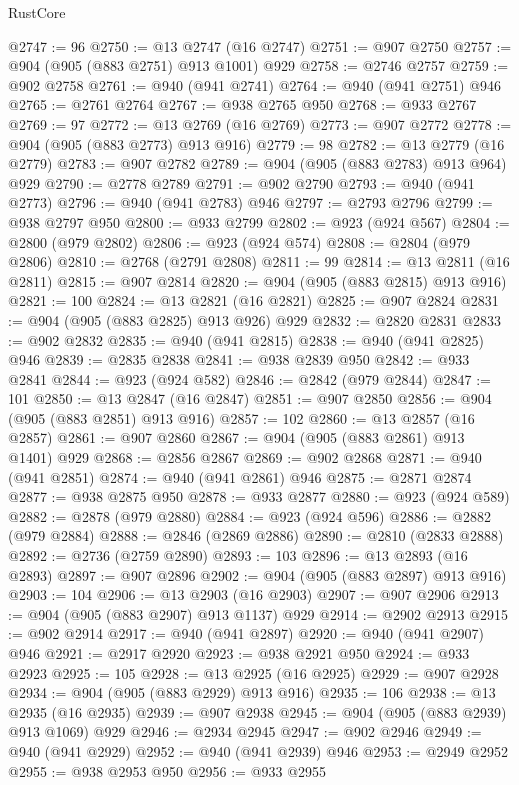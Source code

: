 \begin{lexlean}{RustCore}
\begin{coremodule}
@2747 := 96
@2750 := @13 @2747 (@16 @2747)
@2751 := @907 @2750
@2757 := @904 (@905 (@883 @2751) @913 @1001) @929
@2758 := @2746 @2757
@2759 := @902 @2758
@2761 := @940 (@941 @2741)
@2764 := @940 (@941 @2751) @946
@2765 := @2761 @2764
@2767 := @938 @2765 @950
@2768 := @933 @2767
@2769 := 97
@2772 := @13 @2769 (@16 @2769)
@2773 := @907 @2772
@2778 := @904 (@905 (@883 @2773) @913 @916)
@2779 := 98
@2782 := @13 @2779 (@16 @2779)
@2783 := @907 @2782
@2789 := @904 (@905 (@883 @2783) @913 @964) @929
@2790 := @2778 @2789
@2791 := @902 @2790
@2793 := @940 (@941 @2773)
@2796 := @940 (@941 @2783) @946
@2797 := @2793 @2796
@2799 := @938 @2797 @950
@2800 := @933 @2799
@2802 := @923 (@924 @567)
@2804 := @2800 (@979 @2802)
@2806 := @923 (@924 @574)
@2808 := @2804 (@979 @2806)
@2810 := @2768 (@2791 @2808)
@2811 := 99
@2814 := @13 @2811 (@16 @2811)
@2815 := @907 @2814
@2820 := @904 (@905 (@883 @2815) @913 @916)
@2821 := 100
@2824 := @13 @2821 (@16 @2821)
@2825 := @907 @2824
@2831 := @904 (@905 (@883 @2825) @913 @926) @929
@2832 := @2820 @2831
@2833 := @902 @2832
@2835 := @940 (@941 @2815)
@2838 := @940 (@941 @2825) @946
@2839 := @2835 @2838
@2841 := @938 @2839 @950
@2842 := @933 @2841
@2844 := @923 (@924 @582)
@2846 := @2842 (@979 @2844)
@2847 := 101
@2850 := @13 @2847 (@16 @2847)
@2851 := @907 @2850
@2856 := @904 (@905 (@883 @2851) @913 @916)
@2857 := 102
@2860 := @13 @2857 (@16 @2857)
@2861 := @907 @2860
@2867 := @904 (@905 (@883 @2861) @913 @1401) @929
@2868 := @2856 @2867
@2869 := @902 @2868
@2871 := @940 (@941 @2851)
@2874 := @940 (@941 @2861) @946
@2875 := @2871 @2874
@2877 := @938 @2875 @950
@2878 := @933 @2877
@2880 := @923 (@924 @589)
@2882 := @2878 (@979 @2880)
@2884 := @923 (@924 @596)
@2886 := @2882 (@979 @2884)
@2888 := @2846 (@2869 @2886)
@2890 := @2810 (@2833 @2888)
@2892 := @2736 (@2759 @2890)
@2893 := 103
@2896 := @13 @2893 (@16 @2893)
@2897 := @907 @2896
@2902 := @904 (@905 (@883 @2897) @913 @916)
@2903 := 104
@2906 := @13 @2903 (@16 @2903)
@2907 := @907 @2906
@2913 := @904 (@905 (@883 @2907) @913 @1137) @929
@2914 := @2902 @2913
@2915 := @902 @2914
@2917 := @940 (@941 @2897)
@2920 := @940 (@941 @2907) @946
@2921 := @2917 @2920
@2923 := @938 @2921 @950
@2924 := @933 @2923
@2925 := 105
@2928 := @13 @2925 (@16 @2925)
@2929 := @907 @2928
@2934 := @904 (@905 (@883 @2929) @913 @916)
@2935 := 106
@2938 := @13 @2935 (@16 @2935)
@2939 := @907 @2938
@2945 := @904 (@905 (@883 @2939) @913 @1069) @929
@2946 := @2934 @2945
@2947 := @902 @2946
@2949 := @940 (@941 @2929)
@2952 := @940 (@941 @2939) @946
@2953 := @2949 @2952
@2955 := @938 @2953 @950
@2956 := @933 @2955

\end{coremodule}
\end{lexlean}
